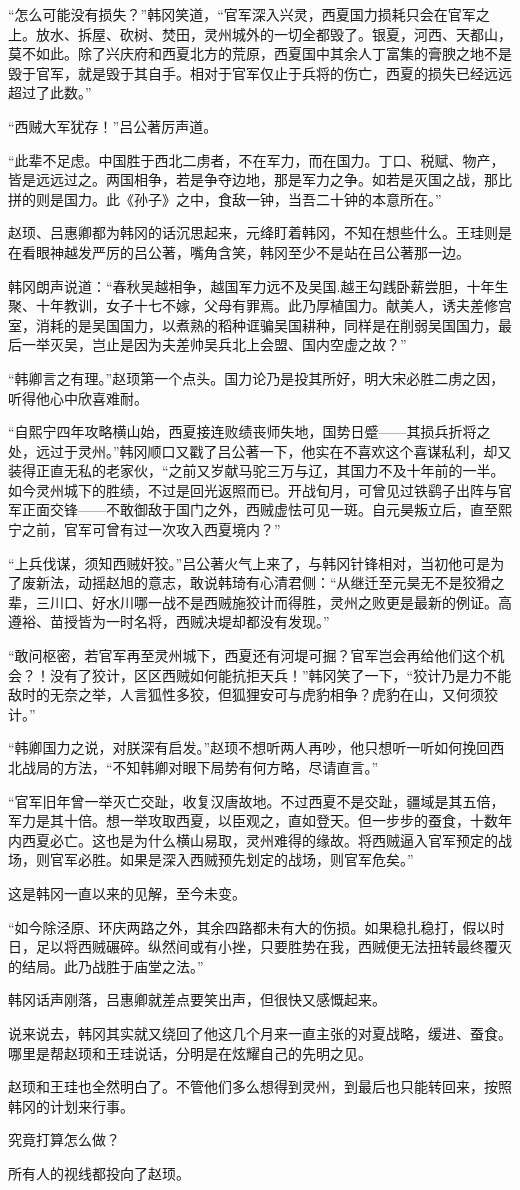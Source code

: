 “怎么可能没有损失？”韩冈笑道，“官军深入兴灵，西夏国力损耗只会在官军之上。放水、拆屋、砍树、焚田，灵州城外的一切全都毁了。银夏，河西、天都山，莫不如此。除了兴庆府和西夏北方的荒原，西夏国中其余人丁富集的膏腴之地不是毁于官军，就是毁于其自手。相对于官军仅止于兵将的伤亡，西夏的损失已经远远超过了此数。”

“西贼大军犹存！”吕公著厉声道。

“此辈不足虑。中国胜于西北二虏者，不在军力，而在国力。丁口、税赋、物产，皆是远远过之。两国相争，若是争夺边地，那是军力之争。如若是灭国之战，那比拼的则是国力。此《孙子》之中，食敌一钟，当吾二十钟的本意所在。”

赵顼、吕惠卿都为韩冈的话沉思起来，元绛盯着韩冈，不知在想些什么。王珪则是在看眼神越发严厉的吕公著，嘴角含笑，韩冈至少不是站在吕公著那一边。

韩冈朗声说道：“春秋吴越相争，越国军力远不及吴国.越王勾践卧薪尝胆，十年生聚、十年教训，女子十七不嫁，父母有罪焉。此乃厚植国力。献美人，诱夫差修宫室，消耗的是吴国国力，以煮熟的稻种诓骗吴国耕种，同样是在削弱吴国国力，最后一举灭吴，岂止是因为夫差帅吴兵北上会盟、国内空虚之故？”

“韩卿言之有理。”赵顼第一个点头。国力论乃是投其所好，明大宋必胜二虏之因，听得他心中欣喜难耐。

“自熙宁四年攻略横山始，西夏接连败绩丧师失地，国势日蹙——其损兵折将之处，远过于灵州。”韩冈顺口又戳了吕公著一下，他实在不喜欢这个喜谋私利，却又装得正直无私的老家伙，“之前又岁献马驼三万与辽，其国力不及十年前的一半。如今灵州城下的胜绩，不过是回光返照而已。开战旬月，可曾见过铁鹞子出阵与官军正面交锋——不敢御敌于国门之外，西贼虚怯可见一斑。自元昊叛立后，直至熙宁之前，官军可曾有过一次攻入西夏境内？”

“上兵伐谋，须知西贼奸狡。”吕公著火气上来了，与韩冈针锋相对，当初他可是为了废新法，动摇赵旭的意志，敢说韩琦有心清君侧：“从继迁至元昊无不是狡猾之辈，三川口、好水川哪一战不是西贼施狡计而得胜，灵州之败更是最新的例证。高遵裕、苗授皆为一时名将，西贼决堤却都没有发现。”

“敢问枢密，若官军再至灵州城下，西夏还有河堤可掘？官军岂会再给他们这个机会？！没有了狡计，区区西贼如何能抗拒天兵！”韩冈笑了一下，“狡计乃是力不能敌时的无奈之举，人言狐性多狡，但狐狸安可与虎豹相争？虎豹在山，又何须狡计。”

“韩卿国力之说，对朕深有启发。”赵顼不想听两人再吵，他只想听一听如何挽回西北战局的方法，“不知韩卿对眼下局势有何方略，尽请直言。”

“官军旧年曾一举灭亡交趾，收复汉唐故地。不过西夏不是交趾，疆域是其五倍，军力是其十倍。想一举攻取西夏，以臣观之，直如登天。但一步步的蚕食，十数年内西夏必亡。这也是为什么横山易取，灵州难得的缘故。将西贼逼入官军预定的战场，则官军必胜。如果是深入西贼预先划定的战场，则官军危矣。”

这是韩冈一直以来的见解，至今未变。

“如今除泾原、环庆两路之外，其余四路都未有大的伤损。如果稳扎稳打，假以时日，足以将西贼碾碎。纵然间或有小挫，只要胜势在我，西贼便无法扭转最终覆灭的结局。此乃战胜于庙堂之法。”

韩冈话声刚落，吕惠卿就差点要笑出声，但很快又感慨起来。

说来说去，韩冈其实就又绕回了他这几个月来一直主张的对夏战略，缓进、蚕食。哪里是帮赵顼和王珪说话，分明是在炫耀自己的先明之见。

赵顼和王珪也全然明白了。不管他们多么想得到灵州，到最后也只能转回来，按照韩冈的计划来行事。

究竟打算怎么做？

所有人的视线都投向了赵顼。

